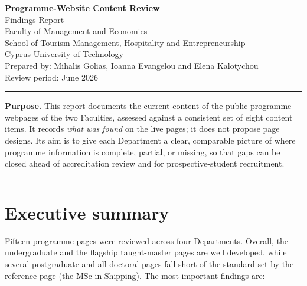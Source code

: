 \documentclass[11pt,a4paper]{article}
\begin{document}
\begin{center}
  {\LARGE\bfseries Programme-Website Content Review}\\[4pt]
  {\large Findings Report}\\[10pt]
  {\normalsize Faculty of Management and Economics\\
  School of Tourism Management, Hospitality and Entrepreneurship\\
  Cyprus University of Technology}\\[10pt]
  {\small Prepared by: Mihalis Golias, Ioanna Evangelou and Elena Kalotychou}\\[2pt]
  {\small Review period: June 2026}
\end{center}

\vspace{4pt}
\hrule
\vspace{10pt}

\noindent\textbf{Purpose.} This report documents the current content of the public programme webpages of the two Faculties, assessed against a consistent set of eight content items. It records \emph{what was found} on the live pages; it does not propose page designs. Its aim is to give each Department a clear, comparable picture of where programme information is complete, partial, or missing, so that gaps can be closed ahead of accreditation review and for prospective-student recruitment.

\tableofcontents
\vspace{6pt}
\hrule

\section{Executive summary}

Fifteen programme pages were reviewed across four Departments. Overall, the undergraduate and the flagship taught-master pages are well developed, while several postgraduate and all doctoral pages fall short of the standard set by the reference page (the MSc in Shipping). The most important findings are:
\end{document}
